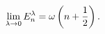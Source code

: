 \begin{equation}
\lim_{ \lambda\rightarrow 0}E^\lambda_n=\omega\left(n+{1\over 2}\right).
\end{equation}

